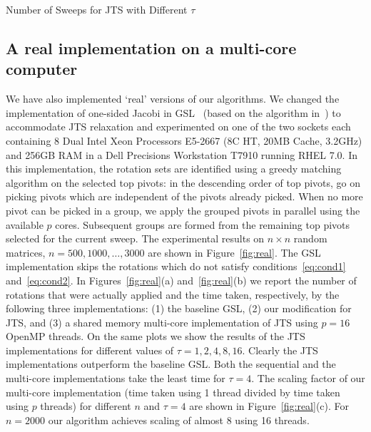 \documentclass[10pt, conference, compsocconf]{IEEEtran}
\begin{document}

\begin{table}
  \centering
  \caption{Number of Sweeps for JTS with Different $\tau$}
  \label{tab:varyk}
  
\end{table}

\subsection{A real implementation on a multi-core computer}

We have also implemented `real' versions of our algorithms. We changed the implementation of one-sided Jacobi in GSL~\cite{galassi1996gnu} (based on the algorithm in~\cite{nash1975one}) to accommodate JTS relaxation and experimented on one of the two sockets each containing 8 Dual Intel Xeon Processors E5-2667 (8C HT, 20MB Cache, 3.2GHz) and 256GB RAM in a Dell Precisions Workstation T7910 running RHEL 7.0. In this implementation, the rotation sets are identified using a greedy matching algorithm on the selected top pivots: in the descending order of top pivots, go on picking pivots which are independent of the pivots already picked. When no more pivot can be picked in a group, we apply the grouped pivots in parallel using the available $p$ cores. Subsequent groups are formed from the remaining top pivots selected for the current sweep. The experimental results on $n \times n$ random matrices, $n=500, 1000, \ldots, 3000$ are shown in Figure~\ref{fig:real}. The GSL implementation skips the rotations which do not satisfy conditions~\eqref{eq:cond1} and~\eqref{eq:cond2}. In Figures~\ref{fig:real}(a) and~\ref{fig:real}(b) we report the number of rotations that were actually applied and the time taken, respectively, by the following three implementations: (1) the baseline GSL, (2) our modification for JTS, and (3) a shared memory multi-core implementation of JTS using $p{=}16$ OpenMP threads. On the same plots we show the results of the JTS implementations for different values of $\tau {=} 1, 2, 4, 8, 16$. Clearly the JTS implementations outperform the baseline GSL. Both the sequential and the multi-core implementations take the least time for $\tau {=} 4$. The scaling factor of our multi-core implementation (time taken using 1 thread divided by time taken using $p$ threads) for different $n$ and $\tau=4$ are shown in Figure~\ref{fig:real}(c). For $n{=}2000$ our algorithm achieves scaling of almost 8 using 16 threads.
\end{document}
